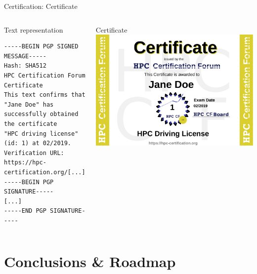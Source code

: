\documentclass[compress,aspectratio=169]{beamer}
\begin{document}
\begin{frame}[fragile]{Certification: Certificate}
\begin{columns}
	\begin{block}{Text representation}

		\scriptsize
		\begin{verbatim}
-----BEGIN PGP SIGNED MESSAGE-----
Hash: SHA512
HPC Certification Forum Certificate
This text confirms that "Jane Doe" has
successfully obtained the certificate
"HPC driving license" (id: 1) at 02/2019.
Verification URL: https://hpc-certification.org/[...]
-----BEGIN PGP SIGNATURE-----
[...]
-----END PGP SIGNATURE-----
		\end{verbatim}
	\end{block}

	\begin{block}{Certificate}
		\medskip
		\includegraphics[width=\textwidth]{jane-doe}
	\end{block}
\end{columns}
\end{frame}



\section{Conclusions \& Roadmap}
\sectionIntroHidden
\end{document}
